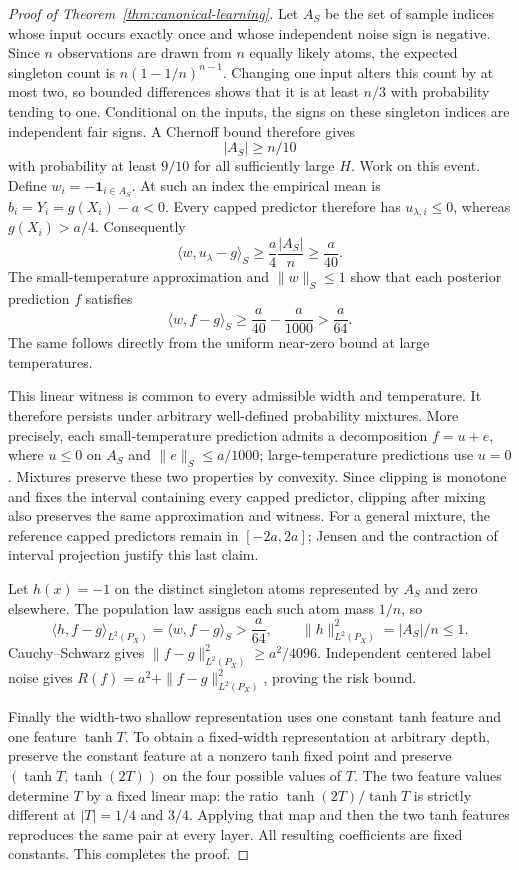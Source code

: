 \begin{proof}[Proof of Theorem~\ref{thm:canonical-learning}]
Let $A_S$ be the set of sample indices whose input occurs exactly once and whose independent noise sign is negative. Since $n$ observations are drawn from $n$ equally likely atoms, the expected singleton count is $n(1-1/n)^{n-1}$. Changing one input alters this count by at most two, so bounded differences shows that it is at least $n/3$ with probability tending to one. Conditional on the inputs, the signs on these singleton indices are independent fair signs. A Chernoff bound therefore gives
\[
 |A_S|\ge n/10
\]
with probability at least $9/10$ for all sufficiently large $H$. Work on this event. Define $w_i=-\mathbf1_{i\in A_S}$. At such an index the empirical mean is $b_i=Y_i=g(X_i)-a<0$. Every capped predictor therefore has $u_{\lambda,i}\le0$, whereas $g(X_i)>a/4$. Consequently
\[
 \langle w,u_\lambda-g\rangle_S\ge\frac a4\frac{|A_S|}n\ge\frac a{40}.
\]
The small-temperature approximation and $\|w\|_S\le1$ show that each posterior prediction $f$ satisfies
\[
 \langle w,f-g\rangle_S\ge\frac a{40}-\frac a{1000}>\frac a{64}.
 \label{eq:canonical-witness}
\]
The same follows directly from the uniform near-zero bound at large temperatures.

This linear witness is common to every admissible width and temperature. It therefore persists under arbitrary well-defined probability mixtures. More precisely, each small-temperature prediction admits a decomposition $f=u+e$, where $u\le0$ on $A_S$ and $\|e\|_S\le a/1000$; large-temperature predictions use $u=0$. Mixtures preserve these two properties by convexity. Since clipping is monotone and fixes the interval containing every capped predictor, clipping after mixing also preserves the same approximation and witness. For a general mixture, the reference capped predictors remain in $[-2a,2a]$; Jensen and the contraction of interval projection justify this last claim.

Let $h(x)=-1$ on the distinct singleton atoms represented by $A_S$ and zero elsewhere. The population law assigns each such atom mass $1/n$, so
\[
 \langle h,f-g\rangle_{L^2(P_X)}=\langle w,f-g\rangle_S>\frac a{64},
 \qquad \|h\|_{L^2(P_X)}^2=|A_S|/n\le1.
\]
Cauchy--Schwarz gives $\|f-g\|_{L^2(P_X)}^2\ge a^2/4096$. Independent centered label noise gives $R(f)=a^2+\|f-g\|_{L^2(P_X)}^2$, proving the risk bound.

Finally the width-two shallow representation uses one constant tanh feature and one feature $\tanh T$. To obtain a fixed-width representation at arbitrary depth, preserve the constant feature at a nonzero tanh fixed point and preserve $(\tanh T,\tanh(2T))$ on the four possible values of $T$. The two feature values determine $T$ by a fixed linear map: the ratio $\tanh(2T)/\tanh T$ is strictly different at $|T|=1/4$ and $3/4$. Applying that map and then the two tanh features reproduces the same pair at every layer. All resulting coefficients are fixed constants. This completes the proof.
\end{proof}

